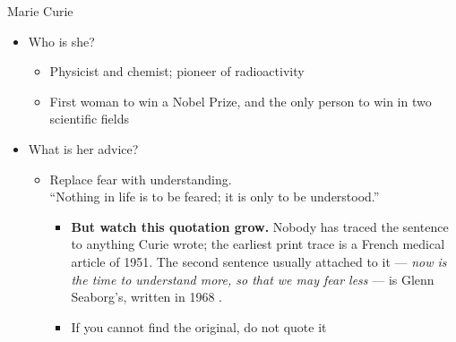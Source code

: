 \documentclass[aspectratio=169]{beamer}
\begin{document}
\begin{frame}{Marie Curie}
  \begin{itemize}
    \item Who is she?
      \begin{itemize}
        \item Physicist and chemist; pioneer of radioactivity
        \item First woman to win a Nobel Prize, and the only person to win in two scientific fields
      \end{itemize}

    \item What is her advice?
      \begin{itemize}
        \item Replace fear with understanding.\\
          ``Nothing in life is to be feared; it is only to be understood.''
          \begin{itemize}
          \item \textbf{But watch this quotation grow.}  Nobody has traced
            the sentence to anything Curie wrote; the earliest print trace is
            a French medical article of 1951.  The second sentence usually
            attached to it --- \emph{now is the time to understand more, so
            that we may fear less} --- is Glenn Seaborg's, written in 1968
            \citep{seaborg1968fear}.
          \item If you cannot find the original, do not quote it
          \end{itemize}
      \end{itemize}
  \end{itemize}
\end{frame}
\end{document}

